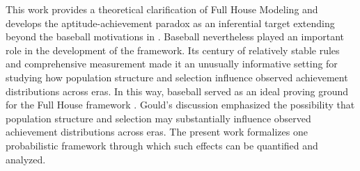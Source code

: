 \documentclass[12pt]{article}
\begin{document}

This work provides a theoretical clarification of Full House Modeling and develops the aptitude-achievement paradox as an inferential target extending beyond the baseball motivations in \cite{yan2025comparing}. Baseball nevertheless played an important role in the development of the framework. Its century of relatively stable rules and comprehensive measurement made it an unusually informative setting for studying how population structure and selection influence observed achievement distributions across eras. %
In this way, baseball served as an ideal proving ground for the Full House framework  \citep{yan2025comparing}. Gould's discussion emphasized the possibility that population structure and selection may substantially influence observed achievement distributions across eras. The present work formalizes one probabilistic framework through which such effects can be quantified and analyzed.
\end{document}
